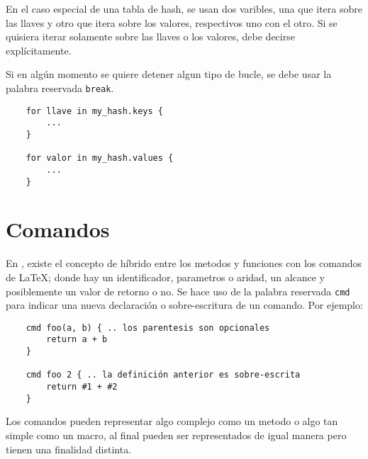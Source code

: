 \documentclass[12pt,letterpaper,titlepage,oneside,openright]{book}
\newcommand{\OhTeX}{%
    \makebox[0.76em][c]{O}%
    \makebox[0.25em][c]{%
        \raisebox{0.14em}[0em][0em]{%
            \fontsize{0.5em}{0cm}%
                \selectfont H%
        }%
    }%
    \makebox[1.35em][c]{\TeX}%
}
\newcommand{\latex}{\LaTeX\xspace}
\newcommand{\ohtex}{\OhTeX\xspace}
\begin{document}
En el caso especial de una tabla de hash, se usan dos varibles, una que itera sobre las llaves y otro que itera sobre los valores, respectivos uno con el otro. Si se quisiera iterar solamente sobre las llaves o los valores, debe decirse explícitamente.

Si en algún momento se quiere detener algun tipo de bucle, se debe usar la palabra reservada \texttt{break}.

\begin{center}
\begin{minipage}{\linewidth}
\begin{lstlisting}
    for llave in my_hash.keys {
        ...
    }

    for valor in my_hash.values {
        ...
    }
\end{lstlisting}
\end{minipage}
\end{center}


\section{Comandos}

En \ohtex, existe el concepto de híbrido entre los metodos y funciones con los comandos de \latex; donde hay un identificador, parametros o aridad, un alcance y posiblemente un valor de retorno o no. Se hace uso de la palabra reservada \texttt{cmd} para indicar una nueva declaración o sobre-escritura de un comando. Por ejemplo:

\begin{center}
\begin{minipage}{\linewidth}
\begin{lstlisting}
    cmd foo(a, b) { .. los parentesis son opcionales
        return a + b
    }

    cmd foo 2 { .. la definición anterior es sobre-escrita
        return #1 + #2
    }
\end{lstlisting}
\end{minipage}
\end{center}

Los comandos pueden representar algo complejo como un metodo o algo tan simple como un macro, al final pueden ser representados de igual manera pero tienen una finalidad distinta.
\end{document}
